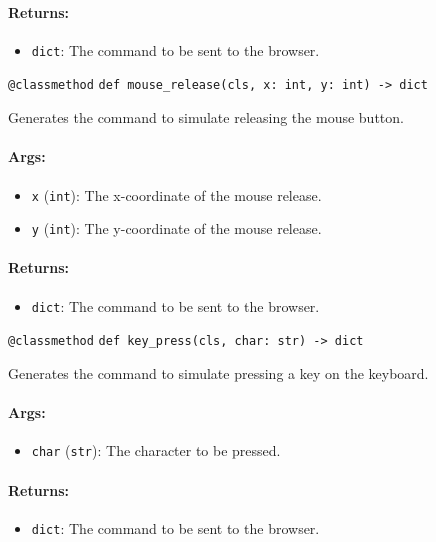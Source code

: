 \documentclass{article}
\begin{document}
\paragraph{Returns:}
\begin{itemize}
    \item \texttt{dict}: The command to be sent to the browser.
\end{itemize}

\noindent\texttt{@classmethod}
\noindent\texttt{def mouse\_release(cls, x: int, y: int) -> dict}

\noindent Generates the command to simulate releasing the mouse button.

\paragraph{Args:}
\begin{itemize}
    \item \texttt{x} (\texttt{int}): The x-coordinate of the mouse release.
    \item \texttt{y} (\texttt{int}): The y-coordinate of the mouse release.
\end{itemize}

\paragraph{Returns:}
\begin{itemize}
    \item \texttt{dict}: The command to be sent to the browser.
\end{itemize}

\noindent\texttt{@classmethod}
\noindent\texttt{def key\_press(cls, char: str) -> dict}

\noindent Generates the command to simulate pressing a key on the keyboard.

\paragraph{Args:}
\begin{itemize}
    \item \texttt{char} (\texttt{str}): The character to be pressed.
\end{itemize}

\paragraph{Returns:}
\begin{itemize}
    \item \texttt{dict}: The command to be sent to the browser.
\end{itemize}
\end{document}

